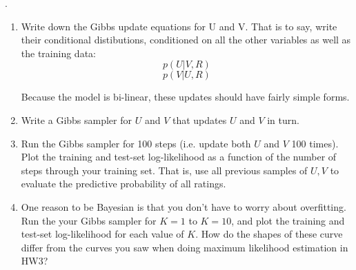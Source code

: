 \documentclass{harvardml}
\theoremstyle{plain}
\begin{document}
\begin{problem}

.

\begin{enumerate}

\item Write down the Gibbs update equations for U and V.  That is to say, write their conditional distibutions, conditioned on all the other variables as well as the training data:
%
$$p(U | V, R )$$
$$p(V | U, R )$$

Because the model is bi-linear, these updates should have fairly simple forms.

\item Write a Gibbs sampler for $U$ and $V$ that updates $U$ and $V$ in turn.

\item Run the Gibbs sampler for 100 steps (i.e. update both $U$ and $V$ 100 times).
Plot the training and test-set log-likelihood as a function of the number of steps through your training set.
That is, use all previous samples of $U, V$ to evaluate the predictive probability of all ratings.

\item One reason to be Bayesian is that you don't have to worry about overfitting.
Run the your Gibbs sampler for $K = 1$ to $K = 10$, and plot the training and test-set log-likelihood for each value of $K$.  How do the shapes of these curve differ from the curves you saw when doing maximum likelihood estimation in HW3?


\end{enumerate}
\end{problem}
\end{document}
